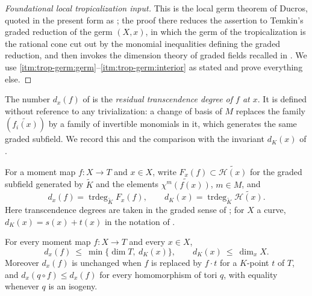 \begin{proof}[Foundational local tropicalization input]
This is the local germ theorem of Ducros, quoted in the present form as
\cite[Proposition~12.2.8 and Remark~12.2.9]{CLD25}; the proof there reduces
the assertion to Temkin's graded reduction of the germ $(X,x)$, in which the
germ of the tropicalization is the rational cone cut out by the
monomial inequalities defining the graded reduction, and then invokes the
dimension theory of graded fields recalled in .
We use \cref{itm:trop-germ:germ}--\cref{itm:trop-germ:interior} as
stated and prove everything else.
\end{proof}

The number $d_x(f)$ of  is the \emph{residual
transcendence degree of $f$ at $x$}. It is defined without reference to any
trivialization: a change of basis of $M$ replaces the family
$(\widetilde{f_i(x)})$ by a family of invertible monomials in it, which
generates the same graded subfield. We record this and the comparison with
the invariant $d_K(x)$ of .

\begin{definition}
\label{def:trop-residual-degree}
For a moment map $f:X\to T$ and $x\in X$, write $F_x(f)\subset
\widetilde{\mathcal H(x)}$ for the graded subfield generated by
$\widetilde K$ and the elements $\widetilde{\chi^m(f(x))}$, $m\in M$, and
\[
 d_x(f)=\operatorname{trdeg}_{\widetilde K}F_x(f),
 \qquad
 d_K(x)=\operatorname{trdeg}_{\widetilde K}\widetilde{\mathcal H(x)} .
\]
Here transcendence degrees are taken in the graded sense of
; for $X$ a curve, $d_K(x)=s(x)+t(x)$ in the
notation of .
\end{definition}

\begin{lemma}
\label{lem:trop-residual-degree-bounds}
For every moment map $f:X\to T$ and every $x\in X$,
\[
 d_x(f)\ \le\ \min\{\dim T,\ d_K(x)\},
 \qquad
 d_K(x)\ \le\ \dim_xX .
\]
Moreover $d_x(f)$ is unchanged when $f$ is replaced by $f\cdot t$ for a
$K$-point $t$ of $T$, and $d_x(q\circ f)\le d_x(f)$ for every homomorphism
of tori $q$, with equality whenever $q$ is an isogeny.
\end{lemma}

